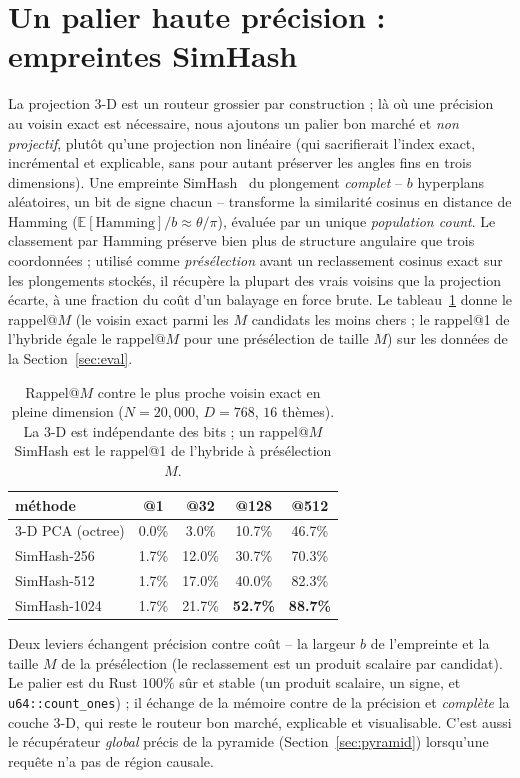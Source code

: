 \documentclass[11pt]{article}
\begin{document}
\section{Un palier haute précision : empreintes SimHash}
\label{sec:sketch}
La projection 3-D est un routeur grossier par construction ; là où une précision au
voisin exact est nécessaire, nous ajoutons un palier bon marché et \emph{non
projectif}, plutôt qu'une projection non linéaire (qui sacrifierait l'index exact,
incrémental et explicable, sans pour autant préserver les angles fins en trois
dimensions). Une empreinte SimHash~\cite{simhash} du plongement \emph{complet} --
$b$ hyperplans aléatoires, un bit de signe chacun -- transforme la similarité cosinus
en distance de Hamming ($\mathbb{E}[\text{Hamming}]/b \approx \theta/\pi$), évaluée
par un unique \emph{population count}. Le classement par Hamming préserve bien plus
de structure angulaire que trois coordonnées ; utilisé comme \emph{présélection}
avant un reclassement cosinus exact sur les plongements stockés, il récupère la
plupart des vrais voisins que la projection écarte, à une fraction du coût d'un
balayage en force brute. Le tableau~\ref{tab:sketch} donne le rappel@$M$ (le voisin
exact parmi les $M$ candidats les moins chers ; le rappel@1 de l'hybride égale le
rappel@$M$ pour une présélection de taille $M$) sur les données de la
Section~\ref{sec:eval}.

\begin{table}[t]
\centering
\caption{Rappel@$M$ contre le plus proche voisin exact en pleine dimension
($N{=}20{,}000$, $D{=}768$, $16$ thèmes). La 3-D est indépendante des bits ; un
rappel@$M$ SimHash est le rappel@1 de l'hybride à présélection $M$.}
\label{tab:sketch}
\begin{tabular}{lcccc}
\toprule
méthode & @1 & @32 & @128 & @512 \\
\midrule
3-D PCA (octree) & 0.0\% & 3.0\% & 10.7\% & 46.7\% \\
SimHash-256 & 1.7\% & 12.0\% & 30.7\% & 70.3\% \\
SimHash-512 & 1.7\% & 17.0\% & 40.0\% & 82.3\% \\
SimHash-1024 & 1.7\% & 21.7\% & \textbf{52.7\%} & \textbf{88.7\%} \\
\bottomrule
\end{tabular}
\end{table}

Deux leviers échangent précision contre coût -- la largeur $b$ de l'empreinte et la
taille $M$ de la présélection (le reclassement est un produit scalaire par candidat).
Le palier est du Rust $100\%$ sûr et stable (un produit scalaire, un signe, et
\texttt{u64::count\_ones}) ; il échange de la mémoire contre de la précision et
\emph{complète} la couche 3-D, qui reste le routeur bon marché, explicable et
visualisable. C'est aussi le récupérateur \emph{global} précis de la pyramide
(Section~\ref{sec:pyramid}) lorsqu'une requête n'a pas de région causale.
\end{document}

